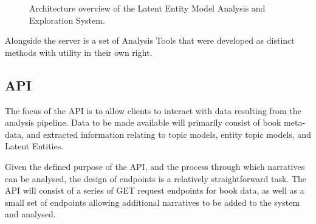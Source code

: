 \documentclass[10pt]{report}
\begin{document}
\begin{figure}[h!]

  
  \caption{Architecture overview of the Latent Entity Model Analysis and Exploration System. \label{fig:architeture_overview}}
\end{figure}


Alongside the server is a set of Analysis Tools that were developed as distinct methods with utility in their own right.

\subsection{API}
The focus of the API is to allow clients to interact with data resulting from the analysis pipeline. Data to be made available will primarily consist of book meta-data, and extracted information relating to topic models, entity topic models, and Latent Entities.

Given the defined purpose of the API, and the process through which narratives can be analysed, the design of endpoints is a relatively straightforward task. The API will consist of a series of GET request endpoints for book data, as well as a small set of endpoints allowing additional narratives to be added to the system and analysed.
\end{document}
